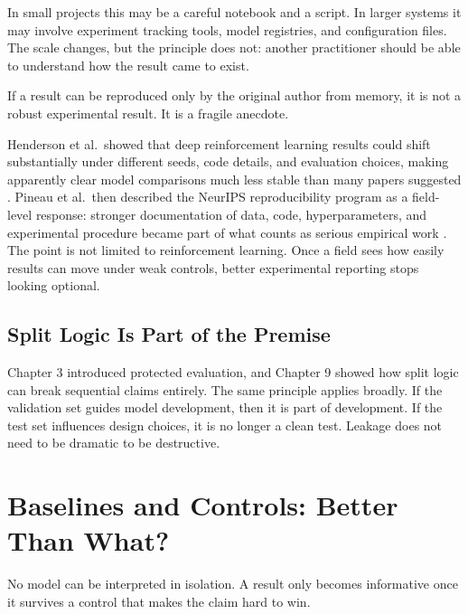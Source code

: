 In small projects this may be a careful notebook and a script. In larger systems it may involve experiment tracking tools, model registries, and configuration files. The scale changes, but the principle does not: another practitioner should be able to understand how the result came to exist.

\begin{practicalnote}
If a result can be reproduced only by the original author from memory, it is not a robust experimental result. It is a fragile anecdote.
\end{practicalnote}

\begin{example}
Henderson et al.\ showed that deep reinforcement learning results could shift substantially under different seeds, code details, and evaluation choices, making apparently clear model comparisons much less stable than many papers suggested \citep{henderson2018}. Pineau et al.\ then described the NeurIPS reproducibility program as a field-level response: stronger documentation of data, code, hyperparameters, and experimental procedure became part of what counts as serious empirical work \citep{pineau2021}. The point is not limited to reinforcement learning. Once a field sees how easily results can move under weak controls, better experimental reporting stops looking optional.
\end{example}

\subsection{Split Logic Is Part of the Premise}

Chapter 3 introduced protected evaluation, and Chapter 9 showed how split logic can break sequential claims entirely. The same principle applies broadly. If the validation set guides model development, then it is part of development. If the test set influences design choices, it is no longer a clean test. Leakage does not need to be dramatic to be destructive.

\section{Baselines and Controls: Better Than What?}

No model can be interpreted in isolation. A result only becomes informative once it survives a control that makes the claim hard to win.

